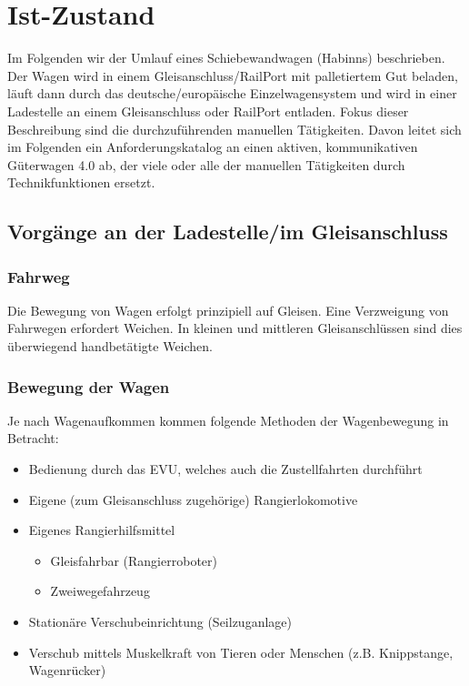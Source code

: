 \section{Ist-Zustand}\label{sec:Istzustand} %
Im Folgenden wir der Umlauf eines \gls{Schiebewandwagen} (Habinns) beschrieben. Der Wagen wird in einem \gls{Gleisanschluss}/RailPort mit palletiertem Gut beladen, läuft dann durch das deutsche/europäische Einzelwagensystem und wird in einer Ladestelle an einem Gleisanschluss oder RailPort entladen. Fokus dieser Beschreibung sind die durchzuführenden manuellen Tätigkeiten. Davon leitet sich im Folgenden ein Anforderungskatalog an einen aktiven, kommunikativen Güterwagen 4.0 ab, der viele oder alle der manuellen Tätigkeiten durch Technikfunktionen ersetzt.

\subsection{Vorgänge an der Ladestelle/im Gleisanschluss}
\subsubsection{Fahrweg} \label{sec:Fahrweg}
Die Bewegung von Wagen erfolgt prinzipiell auf Gleisen. Eine Verzweigung von Fahrwegen erfordert Weichen. In kleinen und mittleren Gleisanschlüssen sind dies überwiegend handbetätigte Weichen. 
\subsubsection{Bewegung der Wagen} \label{sec:BewdWagen}
Je nach Wagenaufkommen kommen folgende Methoden der Wagenbewegung in Betracht:
\begin{itemize}
	\item Bedienung durch das \acrshort{EVU}, welches auch die Zustellfahrten durchführt
	\item Eigene (zum \gls{Gleisanschluss} zugehörige) Rangierlokomotive
	\item Eigenes Rangierhilfsmittel
	\begin{itemize}
	    \item Gleisfahrbar (Rangierroboter)
	    \item Zweiwegefahrzeug
	\end{itemize}
	\item Stationäre Verschubeinrichtung (Seilzuganlage)
	\item Verschub mittels Muskelkraft von Tieren oder Menschen (z.B. Knippstange, Wagenrücker)
\end{itemize}
